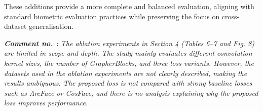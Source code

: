 \documentclass[11pt]{article}
\theoremstyle{remark}
\newcounter{mycounter} %
\newcommand\showReviewcounter{\stepcounter{mycounter}\themycounter}
\begin{document}
\begin{itemize}
	These additions provide a more complete and balanced evaluation, aligning with standard biometric evaluation practices while preserving the focus on cross-dataset generalisation.
\end{itemize}
\color{blue} 
\textbf{\textit{Comment no. \showReviewcounter:}} 
\textit{The ablation experiments in Section 4 (Tables 6–7 and Fig. 8) are limited in scope and depth. The study mainly evaluates different convolution kernel sizes, the number of GrapherBlocks, and three loss variants. However, the datasets used in the ablation experiments are not clearly described, making the results ambiguous. The proposed loss is not compared with strong baseline losses such as ArcFace or CosFace, and there is no analysis explaining why the proposed loss improves performance.}
\color{black}
\end{document}
